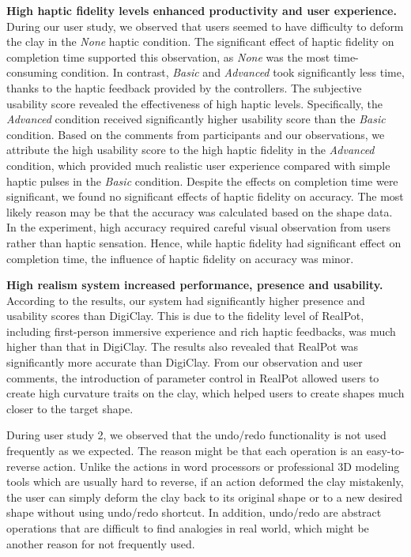 \documentclass{svjour3}                     %
\begin{document}
\textbf{High haptic fidelity levels enhanced productivity and user experience. }
During our user study, we observed that users seemed to have difficulty to deform the clay in the \textit{None} haptic condition.
The significant effect of haptic fidelity on completion time supported this observation, as \textit{None} was the most time-consuming condition.
In contrast, \textit{Basic} and \textit{Advanced} took significantly less time, thanks to the haptic feedback provided by the controllers.
%
The subjective usability score revealed the effectiveness of high haptic levels.
Specifically, the \textit{Advanced} condition received significantly higher usability score than the \textit{Basic} condition.
Based on the comments from participants and our observations, we attribute the high usability score to the high haptic fidelity in the \textit{Advanced} condition, which provided much realistic user experience compared with simple haptic pulses in the \textit{Basic} condition.
%
Despite the effects on completion time were significant, we found no significant effects of haptic fidelity on accuracy.
The most likely reason may be that the accuracy was calculated based on the shape data.
In the experiment, high accuracy required careful visual observation from users rather than haptic sensation.
Hence, while haptic fidelity had significant effect on completion time, the influence of haptic fidelity on accuracy was minor.

\textbf{High realism system increased performance, presence and usability. }
According to the results, our system had significantly higher presence and usability scores than DigiClay.
This is due to the fidelity level of RealPot, including first-person immersive experience and rich haptic feedbacks, was much higher than that in DigiClay.
%
The results also revealed that RealPot was significantly more accurate than DigiClay. 
From our observation and user comments, the introduction of parameter control in RealPot allowed users to create high curvature traits on the clay, which helped users to create shapes much closer to the target shape.

During user study 2, we observed that the undo/redo functionality is not used frequently as we expected.
The reason might be that each operation is an easy-to-reverse action. Unlike the actions in word processors or professional 3D modeling tools which are usually hard to reverse, if an action deformed the clay mistakenly, the user can simply deform the clay back to its original shape or to a new desired shape without using undo/redo shortcut.
In addition, undo/redo are abstract operations that are difficult to find analogies in real world, which might be another reason for not frequently used.
\end{document}

